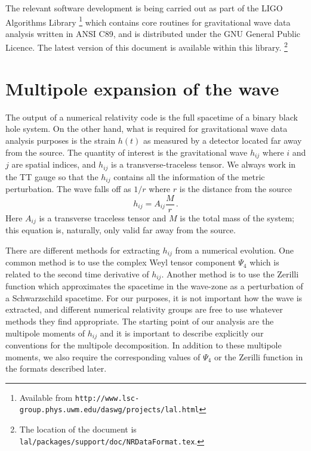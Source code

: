 \documentclass{article}
\numberwithin{equation}{section}
\begin{document}
The relevant software development is being carried out as part of the
LIGO Algorithms Library
\footnote{Available from \texttt{http://www.lsc-group.phys.uwm.edu/daswg/projects/lal.html}}
which contains core routines for gravitational wave data analysis
written in ANSI C89, and is distributed under the GNU General Public
Licence.  The latest version of this document is available within
this library.  \footnote{The location of the document is
  \texttt{lal/packages/support/doc/NRDataFormat.tex}.}



\section{Multipole expansion of the wave}
\label{sec:multipoles}

The output of a numerical relativity code is the full spacetime of a
binary black hole system. On the other hand, what is required for
gravitational wave data analysis purposes is the strain $h(t)$ as
measured by a detector located far away from the source.  The quantity
of interest is the gravitational wave $h_{ij}$ where $i$ and $j$ are
spatial indices, and $h_{ij}$ is a transverse-traceless tensor.  We
always work in the TT gauge so that the $h_{ij}$ contains all the
information of the metric perturbation.  The wave falls off as $1/r$
where $r$ is the distance from the source
\begin{equation}
  \label{eq:1}
  h_{ij} = A_{ij}\frac{M}{r} \,.
\end{equation}
Here $A_{ij}$ is a transverse traceless tensor and $M$ is the total
mass of the system; this equation is, naturally, only valid far away
from the source.  

There are different methods for extracting $h_{ij}$ from a numerical
evolution.  One common method is to use the complex Weyl tensor
component $\Psi_4$ which is related to the second time derivative of
$h_{ij}$. Another method is to use the Zerilli function which
approximates the spacetime in the wave-zone as a perturbation of a
Schwarzschild spacetime.  For our purposes, it is not important how
the wave is extracted, and different numerical relativity groups are
free to use whatever methods they find appropriate.  The starting
point of our analysis are the multipole moments of $h_{ij}$ and it is
important to describe explicitly our conventions for the multipole
decomposition.  In addition to these multipole moments, we also
require the corresponding values of $\Psi_4$ or the Zerilli function
in the formats described later.
\end{document}
